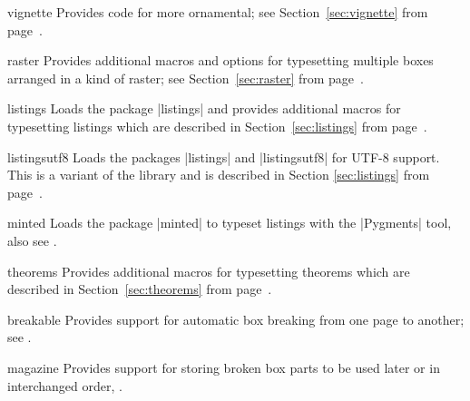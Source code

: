{\begin{docTcbKey}[library]{vignette}{}{}
  Provides code for more ornamental; see
  Section~\ref{sec:vignette} from page~\pageref{sec:vignette}.
\end{docTcbKey}

\begin{docTcbKey}[library]{raster}{}{}
  Provides additional macros and options for typesetting multiple
  boxes arranged in a kind of raster;
  see Section~\ref{sec:raster} from page~\pageref{sec:raster}.
\end{docTcbKey}

\begin{docTcbKey}[library]{listings}{}{}
  Loads the package |listings| \cite{hoffmann:listings} and provides additional
  macros for typesetting listings which are described in Section~\ref{sec:listings}
  from page~\pageref{sec:listings}.
\end{docTcbKey}

\begin{docTcbKey}[library]{listingsutf8}{}{}
  Loads the packages |listings| \cite{hoffmann:listings} and
  |listingsutf8| \cite{oberdiek:listingsutf8} for UTF-8 support.
  This is a variant of the library 
  and is described in Section \ref{sec:listings}
  from page~\pageref{sec:listings}.
\end{docTcbKey}

\begin{docTcbKey}[library]{minted}{}{}
  Loads the package |minted| \cite{poore:minted} to
  typeset listings with the |Pygments| \cite{pygments:web} tool,
  also see .
\end{docTcbKey}

\begin{docTcbKey}[library]{theorems}{}{}
  Provides additional
  macros for typesetting theorems which are described in Section~\ref{sec:theorems}
  from page~\pageref{sec:theorems}.
\end{docTcbKey}


\begin{docTcbKey}[library]{breakable}{}{}
  Provides support for automatic box breaking from one page to another;
  see .
\end{docTcbKey}

\begin{docTcbKey}[library]{magazine}{}{}
  Provides support for storing broken box parts to be used later or
  in interchanged order, .
\end{docTcbKey}

}
